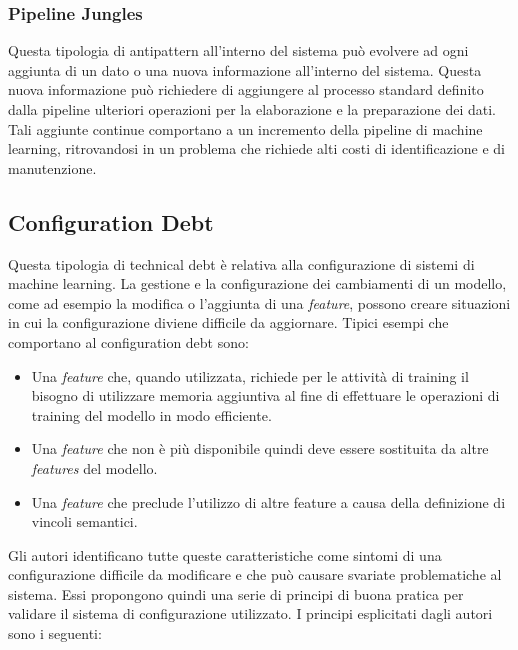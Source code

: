 \subsubsection{Pipeline Jungles}
Questa tipologia di antipattern all'interno del sistema può evolvere ad ogni aggiunta di un dato o una nuova informazione all'interno del sistema.
Questa nuova informazione può richiedere di aggiungere al processo standard definito dalla pipeline ulteriori operazioni per la elaborazione e la preparazione dei dati. Tali aggiunte continue comportano a un incremento della pipeline di machine learning, ritrovandosi in un problema che richiede alti costi di identificazione e di manutenzione.

\subsection{Configuration Debt}
Questa tipologia di technical debt è relativa alla configurazione di sistemi di machine learning.
La gestione e la configurazione dei cambiamenti di un modello, come ad esempio la modifica o l'aggiunta di una \textit{feature}, possono creare situazioni in cui la configurazione diviene difficile da aggiornare.
Tipici esempi che comportano al configuration debt sono:
\begin{itemize}
    \item Una \textit{feature} che, quando utilizzata, richiede per le attività di training il bisogno di utilizzare memoria aggiuntiva al fine di effettuare le operazioni di training del modello in modo efficiente.
    \item Una \textit{feature} che non è più disponibile quindi deve essere sostituita da altre \textit{features} del modello.
    \item Una \textit{feature} che preclude l'utilizzo di altre feature a causa della definizione di vincoli semantici.
\end{itemize}

Gli autori identificano tutte queste caratteristiche come sintomi di una configurazione difficile da modificare e che può causare svariate problematiche al sistema.
Essi propongono quindi una serie di principi di buona pratica per validare il sistema di configurazione utilizzato.
I principi esplicitati dagli autori sono i seguenti:

